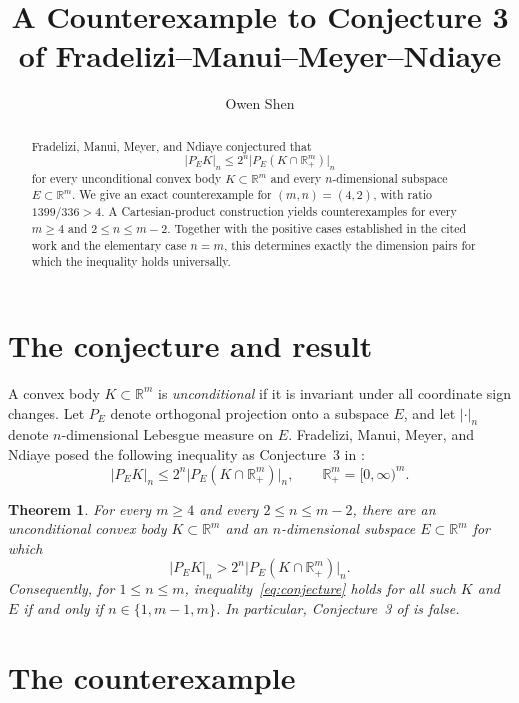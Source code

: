 \documentclass[11pt]{amsart}
\title[A counterexample to Conjecture 3]
{A Counterexample to Conjecture 3 of Fradelizi--Manui--Meyer--Ndiaye}
\author{Owen Shen}
\date{}
\newtheorem{theorem}{Theorem}
\theoremstyle{remark}
\newcommand{\R}{\mathbb{R}}
\begin{document}
\begin{abstract}
Fradelizi, Manui, Meyer, and Ndiaye conjectured that
\[
  |P_EK|_n\le 2^n\bigl|P_E(K\cap\R_+^m)\bigr|_n
\]
for every unconditional convex body $K\subset\R^m$ and every $n$-dimensional
subspace $E\subset\R^m$. We give an exact counterexample for $(m,n)=(4,2)$,
with ratio $1399/336>4$. A Cartesian-product construction yields
counterexamples for every $m\ge4$ and $2\le n\le m-2$. Together with the
positive cases established in the cited work and the elementary case $n=m$,
this determines exactly the dimension pairs for which the inequality holds
universally.
\end{abstract}

\maketitle

\section{The conjecture and result}

A convex body $K\subset\R^m$ is \emph{unconditional} if it is invariant under
all coordinate sign changes. Let $P_E$ denote orthogonal projection onto a
subspace $E$, and let $|\cdot|_n$ denote $n$-dimensional Lebesgue measure on
$E$. Fradelizi, Manui, Meyer, and Ndiaye posed the following inequality as
Conjecture~3 in \cite{FMMN}:
\begin{equation}\label{eq:conjecture}
  |P_EK|_n\le 2^n\bigl|P_E(K\cap\R_+^m)\bigr|_n,
  \qquad \R_+^m=[0,\infty)^m.
\end{equation}

\begin{theorem}\label{thm:main}
For every $m\ge4$ and every $2\le n\le m-2$, there are an unconditional convex
body $K\subset\R^m$ and an $n$-dimensional subspace $E\subset\R^m$ for which
\[
  |P_EK|_n>2^n\bigl|P_E(K\cap\R_+^m)\bigr|_n.
\]
Consequently, for $1\le n\le m$, inequality~\eqref{eq:conjecture} holds for
all such $K$ and $E$ if and only if $n\in\{1,m-1,m\}$. In particular,
Conjecture~3 of \cite{FMMN} is false.
\end{theorem}

\section{The counterexample}
\end{document}
